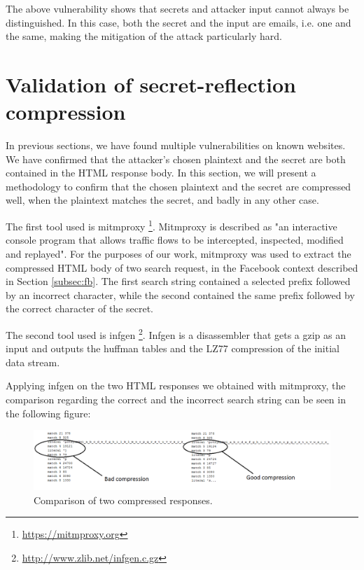 The above vulnerability shows that secrets and attacker input cannot always be
distinguished. In this case, both the secret and the input are emails, i.e. one
and the same, making the mitigation of the attack particularly hard.

\section{Validation of secret-reflection compression}\label{sec:mitmproxy}

In previous sections, we have found multiple vulnerabilities on known websites.
We have confirmed that the attacker's chosen plaintext and the secret are both
contained in the HTML response body. In this section, we will present a
methodology to confirm that the chosen plaintext and the secret are compressed
well, when the plaintext matches the secret, and badly in any other case.

The first tool used is mitmproxy \footnote{\url{https://mitmproxy.org}}.
Mitmproxy is described as "an interactive console program that allows traffic
flows to be intercepted, inspected, modified and replayed". For the purposes of
our work, mitmproxy was used to extract the compressed HTML body of two search
request, in the Facebook context described in Section \ref{subsec:fb}. The first
search string contained a selected prefix followed by an incorrect character,
while the second contained the same prefix followed by the correct character of
    the secret.

The second tool used is infgen \footnote{\url{http://www.zlib.net/infgen.c.gz}}.
Infgen is a disassembler that gets a gzip as an input and outputs the huffman
tables and the LZ77 compression of the initial data stream.

Applying infgen on the two HTML responses we obtained with mitmproxy, the
comparison regarding the correct and the incorrect search string can be seen in
the following figure:

\begin{figure}[H] \caption{Comparison of two compressed responses.}
\includegraphics[width=1.15\textwidth]{diagrams/compression_comparison.png}\end{figure}

